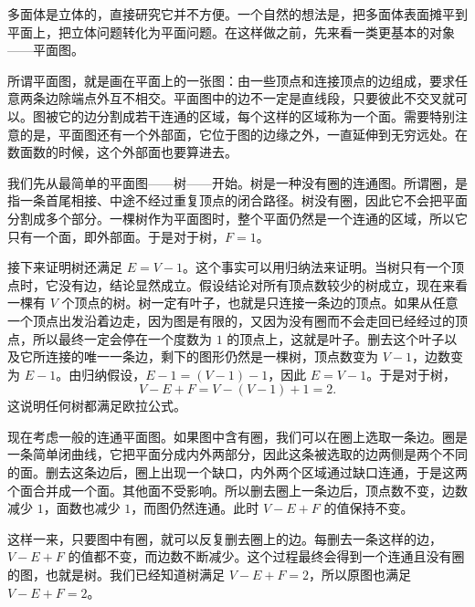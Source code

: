 \documentclass[12pt,UTF8,fontset=none]{ctexbook}
\begin{document}
多面体是立体的，直接研究它并不方便。一个自然的想法是，把多面体表面摊平到平面上，把立体问题转化为平面问题。在这样做之前，先来看一类更基本的对象——平面图。

所谓平面图，就是画在平面上的一张图：由一些顶点和连接顶点的边组成，要求任意两条边除端点外互不相交。平面图中的边不一定是直线段，只要彼此不交叉就可以。图被它的边分割成若干连通的区域，每个这样的区域称为一个面。需要特别注意的是，平面图还有一个外部面，它位于图的边缘之外，一直延伸到无穷远处。在数面数的时候，这个外部面也要算进去。


我们先从最简单的平面图——树——开始。树是一种没有圈的连通图。所谓圈，是指一条首尾相接、中途不经过重复顶点的闭合路径。树没有圈，因此它不会把平面分割成多个部分。一棵树作为平面图时，整个平面仍然是一个连通的区域，所以它只有一个面，即外部面。于是对于树，$F=1$。

接下来证明树还满足 $E=V-1$。这个事实可以用归纳法来证明。当树只有一个顶点时，它没有边，结论显然成立。假设结论对所有顶点数较少的树成立，现在来看一棵有 $V$ 个顶点的树。树一定有叶子，也就是只连接一条边的顶点。如果从任意一个顶点出发沿着边走，因为图是有限的，又因为没有圈而不会走回已经经过的顶点，所以最终一定会停在一个度数为 $1$ 的顶点上，这就是叶子。删去这个叶子以及它所连接的唯一一条边，剩下的图形仍然是一棵树，顶点数变为 $V-1$，边数变为 $E-1$。由归纳假设，$E-1=(V-1)-1$，因此 $E=V-1$。于是对于树，
\[
V-E+F=V-(V-1)+1=2.
\]
这说明任何树都满足欧拉公式。


现在考虑一般的连通平面图。如果图中含有圈，我们可以在圈上选取一条边。圈是一条简单闭曲线，它把平面分成内外两部分，因此这条被选取的边两侧是两个不同的面。删去这条边后，圈上出现一个缺口，内外两个区域通过缺口连通，于是这两个面合并成一个面。其他面不受影响。所以删去圈上一条边后，顶点数不变，边数减少 $1$，面数也减少 $1$，而图仍然连通。此时 $V-E+F$ 的值保持不变。


这样一来，只要图中有圈，就可以反复删去圈上的边。每删去一条这样的边，$V-E+F$ 的值都不变，而边数不断减少。这个过程最终会得到一个连通且没有圈的图，也就是树。我们已经知道树满足 $V-E+F=2$，所以原图也满足 $V-E+F=2$。
\end{document}
